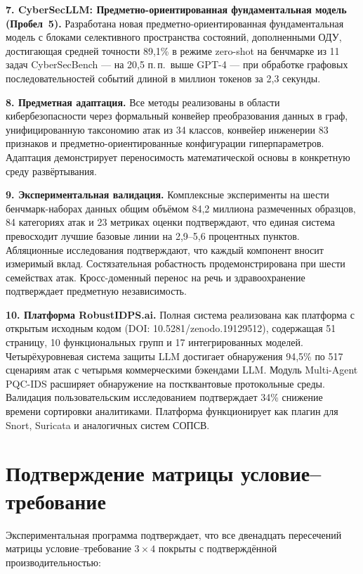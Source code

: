 \noindent\textbf{7. CyberSecLLM: Предметно-ориентированная фундаментальная модель (Пробел~5).}
Разработана новая предметно-ориентированная фундаментальная модель с блоками селективного пространства состояний, дополненными ОДУ, достигающая средней точности 89,1\% в режиме zero-shot на бенчмарке из 11 задач CyberSecBench --- на 20,5 п.\,п.\ выше GPT-4 --- при обработке графовых последовательностей событий длиной в миллион токенов за 2,3 секунды.

\noindent\textbf{8. Предметная адаптация.}
Все методы реализованы в области кибербезопасности через формальный конвейер преобразования данных в граф, унифицированную таксономию атак из 34 классов, конвейер инженерии 83 признаков и предметно-ориентированные конфигурации гиперпараметров. Адаптация демонстрирует переносимость математической основы в конкретную среду развёртывания.

\noindent\textbf{9. Экспериментальная валидация.}
Комплексные эксперименты на шести бенчмарк-наборах данных общим объёмом 84,2 миллиона размеченных образцов, 84 категориях атак и 23 метриках оценки подтверждают, что единая система превосходит лучшие базовые линии на 2,9--5,6 процентных пунктов. Абляционные исследования подтверждают, что каждый компонент вносит измеримый вклад. Состязательная робастность продемонстрирована при шести семействах атак. Кросс-доменный перенос на речь и здравоохранение подтверждает предметную независимость.

\noindent\textbf{10. Платформа RobustIDPS.ai.}
Полная система реализована как платформа с открытым исходным кодом (DOI: 10.5281/zenodo.19129512), содержащая 51 страницу, 10 функциональных групп и 17 интегрированных моделей. Четырёхуровневая система защиты LLM достигает обнаружения 94,5\% по 517 сценариям атак с четырьмя коммерческими бэкендами LLM. Модуль Multi-Agent PQC-IDS расширяет обнаружение на постквантовые протокольные среды. Валидация пользовательским исследованием подтверждает 34\% снижение времени сортировки аналитиками. Платформа функционирует как плагин для Snort, Suricata и аналогичных систем СОПСВ.

\section*{Подтверждение матрицы условие--требование}

Экспериментальная программа подтверждает, что все двенадцать пересечений матрицы условие--требование $3\times4$ покрыты с подтверждённой производительностью:

